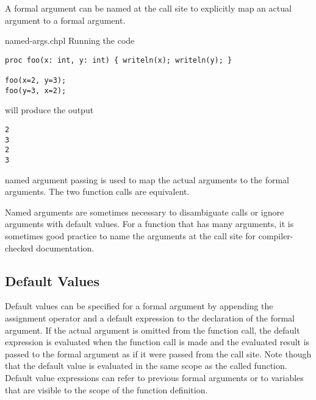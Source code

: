A formal argument can be named at the call site to explicitly map an
actual argument to a formal argument.

\begin{chapelexample}{named-args.chpl}
Running the code
\begin{chapel}
\begin{verbatim}
proc foo(x: int, y: int) { writeln(x); writeln(y); }

foo(x=2, y=3);
foo(y=3, x=2);
\end{verbatim}
\end{chapel}
will produce the output
\begin{chapelprintoutput}
\begin{verbatim}
2
3
2
3
\end{verbatim}
\end{chapelprintoutput}
named argument passing is used to map the actual arguments to the
formal arguments.  The two function calls are equivalent.
\end{chapelexample}

Named arguments are sometimes necessary to disambiguate calls or
ignore arguments with default values.  For a function that has many
arguments, it is sometimes good practice to name the arguments at the
call site for compiler-checked documentation.

\subsection{Default Values}
\label{Default_Values}

Default values can be specified for a formal argument by appending the
assignment operator and a default expression to the declaration of the
formal argument.  If the actual argument is omitted from the function
call, the default expression is evaluated when the function call is
made and the evaluated result is passed to the formal argument as if
it were passed from the call site. Note though that the default value
is evaluated in the same scope as the called function. Default value
expressions can refer to previous formal arguments or to variables
that are visible to the scope of the function definition.

